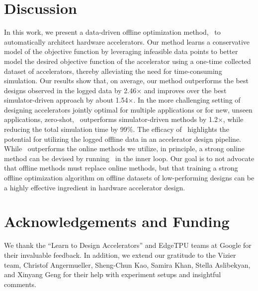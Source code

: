 \vspace{-0.1cm}
\section{Discussion}
\label{sec:discussion}
\vspace{-0.2cm}
%
In this work, we present a data-driven offline optimization method, \primemethodname\ to automatically architect hardware accelerators. Our method learns a conservative model of the objective function by leveraging  infeasible data points to better model the desired objective function of the accelerator using a one-time collected dataset of accelerators, thereby alleviating the need for time-consuming simulation.
%
Our results show that, on average, our method outperforms the best designs observed in the logged data by 2.46$\times$ and improves over the best simulator-driven approach by about 1.54$\times$. 
%
In the more challenging setting of designing accelerators jointly optimal for multiple applications or for new, unseen applications, zero-shot, \primemethodname\ outperforms simulator-driven methods by 1.2$\times$, while reducing the total simulation time by 99\%.
%
{The efficacy of \primemethodname\ highlights the potential for utilizing the logged offline data in an accelerator design pipeline. While \primemethodname\ outperforms the online methods we utilize, in principle, a strong online method can be devised by running \primemethodname\ in the inner loop. Our goal is to not advocate that offline methods must replace online methods, but that training a strong offline optimization algorithm on offline datasets of low-performing designs can be a highly effective ingredient in hardware accelerator design.}


\section*{Acknowledgements and Funding}
%
We thank the ``Learn to Design Accelerators'' and EdgeTPU teams at Google for their invaluable feedback.
%
In addition, we extend our gratitude to the Vizier team, Christof Angermueller, Sheng-Chun Kao, Samira Khan, Stella Aslibekyan, and Xinyang Geng for their help with experiment setups and insightful comments. 